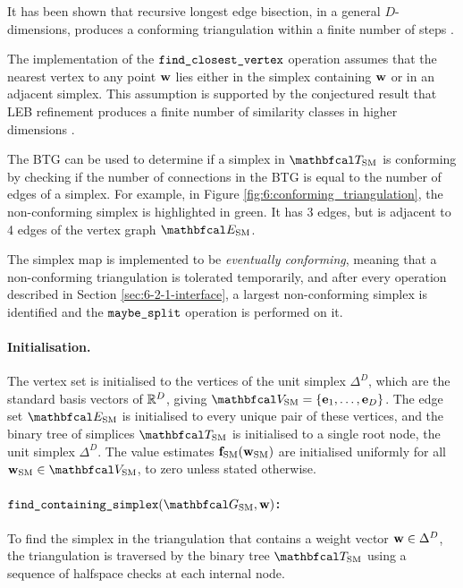         It has been shown that recursive longest edge bisection, in a general $D$-dimensions, produces a conforming triangulation within a finite number of steps \cite{mesh_refine_framework,mesh_refine,simplex_refine}.

        The implementation of the ${\textnormal{\texttt{find\_closest\_vertex}}}$ operation assumes that 
        the nearest vertex to any point $\mathbf{w}$ lies either 
        in the simplex containing $\mathbf{w}$ or in an adjacent 
        simplex. This assumption is supported by the conjectured 
        result that LEB refinement produces a finite number of 
        similarity classes in higher dimensions 
        \cite{leb_nd_regular_empirical}.

        The BTG can be used to determine if a simplex in $\TSM$ is conforming by checking if the number of connections in the BTG is equal to the number of edges of a simplex. For example, in Figure \ref{fig:6:conforming_triangulation}, the non-conforming simplex is highlighted in green. It has 3 edges, but is adjacent to 4 edges of the vertex graph $\ESM$.

        The simplex map is implemented to be \textit{eventually conforming}, meaning that a non-conforming triangulation is tolerated temporarily, and after every operation described in Section \ref{sec:6-2-1-interface}, a largest non-conforming simplex is identified and the ${\textnormal{\texttt{maybe\_split}}}$ operation is performed on it. 


    \paragraph{Initialisation.}

        The vertex set is initialised to the vertices of the unit simplex $\Delta^D$, which are the standard basis vectors of $\mathbb{R}^D$, giving $\VSM=\{\bff{e}_1,\ldots,\bff{e}_D\}$. The edge set $\ESM$ is initialised to every unique pair of these vertices, and the binary tree of simplices $\TSM$ is initialised to a single root node, the unit simplex $\Delta^D$. The value estimates ${\mathbf{f}_{{\textnormal{SM}}}}({\mathbf{w}_{{\textnormal{SM}}}})$ are initialised uniformly for all $\wSM\in\VSM$, to zero unless stated otherwise.


    \paragraph{$\fcs(\GSM, \bff{w})$:}

        To find the simplex in the triangulation that contains a weight vector $\mathbf{w}\in\Delta^D$, the triangulation is traversed by the binary tree $\TSM$ using a sequence of halfspace checks at each internal node. 

